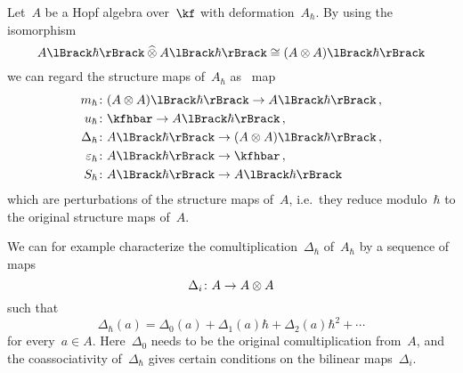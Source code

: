 \documentclass[a4paper, 11pt, oneside]{scrartcl}
\begin{document}
\begin{remark}
  Let~$A$ be a Hopf algebra over~$\kf$ with deformation~$A_{\hbar}$.
  By using the isomorphism
  \[
    \power{A}{\hbar} \ctensor \power{A}{\hbar}
    \cong
    \power{(A \tensor A)}{\hbar}
  \]
  we can regard the structure maps of~$A_{\hbar}$ as~\linear{$\kfhbar$} map
  \begin{equation}
    \label{explicit description of deformed hopf algebra}
    \begin{aligned}
      m_{\hbar} &\colon \power{(A \tensor A)}{\hbar} \to \power{A}{\hbar} \,,
      \\
      u_{\hbar} &\colon \kfhbar \to \power{A}{\hbar} \,,
      \\
      \Delta_{\hbar} &\colon \power{A}{\hbar} \to \power{(A \tensor A)}{\hbar} \,,
      \\
      \varepsilon_{\hbar} &\colon \power{A}{\hbar} \to \kfhbar \,,
      \\
      S_{\hbar} &\colon \power{A}{\hbar} \to \power{A}{\hbar}
    \end{aligned}
  \end{equation}
  which are perturbations of the structure maps of~$A$, i.e.\ they reduce modulo~$\hbar$ to the original structure maps of~$A$.

  We can for example characterize the comultiplication~$\Delta_{\hbar}$ of~$A_{\hbar}$ by a sequence of~\bilinear{$\kf$} maps
  \[
    \Delta_i \colon A \to A \otimes A
  \]
  such that
  \[
    \Delta_{\hbar}(a)
    =
    \Delta_0(a) + \Delta_1(a) \hbar + \Delta_2(a) \hbar^2 + \dotsb
  \]
  for every~$a \in A$.
  Here~$\Delta_0$ needs to be the original comultiplication from~$A$, and the coassociativity of~$\Delta_{\hbar}$ gives certain conditions on the bilinear maps~$\Delta_i$.
\end{remark}
\end{document}
